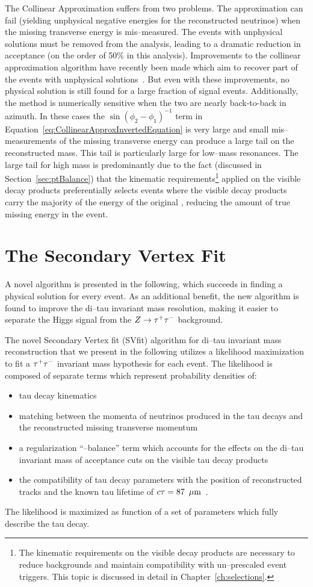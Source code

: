 The Collinear Approximation suffers from two problems.  The approximation can
fail (yielding unphysical negative energies for the reconstructed neutrinos)
when the missing transverse energy is mis--measured.  The events with unphysical
solutions must be removed from the analysis, leading to a dramatic reduction in
acceptance (on the order of 50\% in this analysis).  Improvements to the
collinear approximation algorithm have recently been made which aim to recover
part of the events with unphysical solutions~\cite{improvedCollinearApprox}.
But even with these improvements, no physical solution is still found for a
large fraction of signal events.  Additionally, the method is numerically
sensitive when the two \taul are nearly back-to-back in azimuth.  In these cases
the $\sin(\phi_2 - \phi_1)^{-1}$ term in
Equation~\ref{eq:CollinearApproxInvertedEquation} is very large and small
mis--measurements of the missing transverse energy can produce a large tail on
the reconstructed mass.  This tail is particularly large for low--mass
resonances.  The large tail for high mass is predominantly due to the fact
(discussed in Section~\ref{sec:ptBalance}) that the kinematic
requirements\footnote{The kinematic requirements on the visible decay products
are necessary to reduce backgrounds and maintain compatibility with
un--prescaled event triggers.  This topic is discussed in detail in
Chapter~\ref{ch:selections}.} applied on the visible decay products
preferentially selects events where the visible decay products carry the
majority of the energy of the original \taul, reducing the amount of true
missing energy in the event.  

\section{The Secondary Vertex Fit}
A novel algorithm is presented in the following, which succeeds in finding a
physical solution for every event.  As an additional benefit, the new algorithm
is found to improve the di--tau invariant mass resolution, making it easier to
separate the Higgs signal from the $\mbox{\ensuremath{Z\to\tau^+\tau^-}}$ background.

The novel Secondary Vertex fit (SVfit) algorithm for di--tau invariant mass
reconstruction that we present in the following utilizes a likelihood
maximization to fit a $\tau^+\tau^-$ invariant mass hypothesis for each
event.  The likelihood is composed of separate terms which represent probability
densities of:
\begin{itemize}
\item tau decay kinematics
\item matching between the momenta of neutrinos produced in the tau decays and
  the reconstructed missing transverse momentum
\item a regularization ``\pt--balance'' term which accounts for the effects on the di--tau invariant mass
 of acceptance cuts on the visible tau decay products
\item the compatibility of tau decay parameters with the position of reconstructed tracks
 and the known tau lifetime of $c\tau = 87~\,\mu\text{m}$~\cite{PDG}.
\end{itemize}
The likelihood is maximized as function of a set of parameters which fully describe the tau decay.

